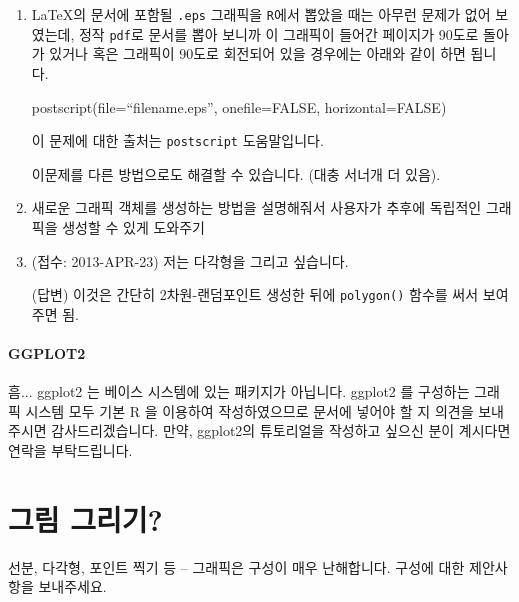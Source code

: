 \documentclass[../tutorial.tex]{subfiles}
\begin{document}
\begin{enumerate}
\item \LaTeX 의 문서에 포함될 \texttt{.eps} 그래픽을 \texttt{R}에서 뽑았을 때는 아무런 문제가 없어 보였는데, 정작 \texttt{pdf}로 문서를 뽑아 보니까 이 그래픽이 들어간 페이지가 90도로 돌아가 있거나 혹은 그래픽이 90도로 회전되어 있을 경우에는 아래와 같이 하면 됩니다.

\begin{Schunk}
 \begin{Sinput}
  postscript(file=``filename.eps'', onefile=FALSE, horizontal=FALSE)
 \end{Sinput}
\end{Schunk}

이 문제에 대한 출처는 \texttt{postscript} 도움말입니다.

이문제를 다른 방법으로도 해결할 수 있습니다.  (대충 서너개 더 있음).

\item 새로운 그래픽 객체를 생성하는 방법을 설명해줘서 사용자가 추후에 독립적인 그래픽을 생성할 수 있게 도와주기 

	\item (접수: 2013-APR-23)  저는 다각형을 그리고 싶습니다. 
	
	\textsf{(답변)}  이것은 간단히 2차원-랜덤포인트 생성한 뒤에 \texttt{polygon()} 함수를 써서 보여주면 됨. 

\end{enumerate}



\paragraph{GGPLOT2}
흠...  ggplot2 는 베이스 시스템에 있는 패키지가 아닙니다. 
ggplot2 를 구성하는 그래픽 시스템 모두 기본 R 을 이용하여 작성하였으므로 문서에 넣어야 할 지 의견을 보내주시면 감사드리겠습니다.
만약, ggplot2의 튜토리얼을 작성하고 싶으신 분이 계시다면 연락을 부탁드립니다. 



\section{그림 그리기?}

선분, 다각형, 포인트 찍기 등 -- 그래픽은 구성이 매우 난해합니다. 
구성에 대한 제안사항을 보내주세요.
\end{document}
